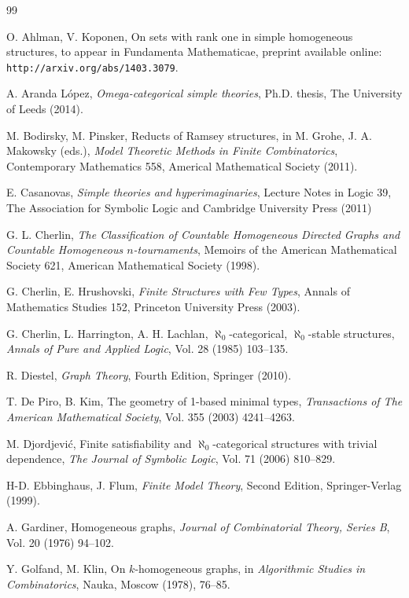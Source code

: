 \documentclass[11pt, twoside]{amsart}
\numberwithin{equation}{section}
\begin{document}
\begin{thebibliography}{99}\label{References}

 O. Ahlman, V. Koponen, On sets with rank one in simple homogeneous structures,
to appear in Fundamenta Mathematicae, preprint available online:
{\tt http://arxiv.org/abs/1403.3079}.

 A. Aranda L\'{o}pez, {\em Omega-categorical simple theories}, Ph.D. thesis, 
The University of Leeds (2014).

 M. Bodirsky, M. Pinsker, Reducts of Ramsey structures,
in M. Grohe, J. A. Makowsky (eds.), 
{\em Model Theoretic Methods in Finite Combinatorics},
Contemporary Mathematics 558, Americal Mathematical Society (2011).

 E. Casanovas, {\em Simple theories and hyperimaginaries}, Lecture Notes in Logic 39, 
The Association for Symbolic Logic and Cambridge University Press (2011)

 G. L. Cherlin, {\em The Classification of Countable Homogeneous Directed Graphs
and Countable Homogeneous $n$-tournaments}, 
Memoirs of the American Mathematical Society 621, American Mathematical Society (1998).

 G. Cherlin, E. Hrushovski, {\em Finite Structures with Few Types}, 
Annals of Mathematics Studies 152, Princeton University Press (2003).

 G. Cherlin, L. Harrington, A. H. Lachlan, $\aleph_0$-categorical, $\aleph_0$-stable structures,
{\em Annals of Pure and Applied Logic}, Vol. 28 (1985) 103--135.

 R. Diestel, {\em Graph Theory}, Fourth Edition, Springer (2010).

 T. De Piro, B. Kim, The geometry of 1-based minimal types,
{\em Transactions of The American Mathematical Society}, Vol. 355 (2003) 4241--4263.

 M. Djordjevi\'{c}, Finite satisfiability and $\aleph_0$-categorical structures with trivial dependence,
{\em The Journal of Symbolic Logic}, Vol. 71 (2006) 810--829.

 H-D. Ebbinghaus, J. Flum, {\em Finite Model Theory}, Second Edition, Springer-Verlag (1999).

 A. Gardiner, Homogeneous graphs, 
{\em Journal of Combinatorial Theory, Series B}, Vol. 20 (1976) 94--102.

 Y. Golfand, M. Klin, On $k$-homogeneous graphs, 
in {\em Algorithmic Studies in Combinatorics}, Nauka, Moscow (1978), 76--85.


\end{thebibliography}
\end{document}
